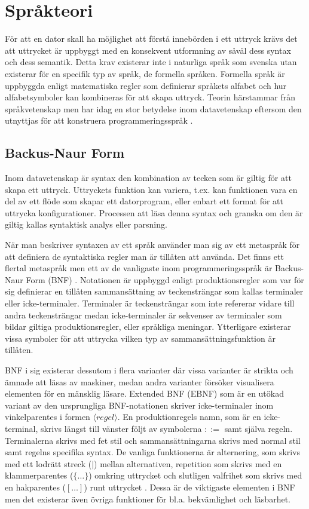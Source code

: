 \section{Språkteori}

För att en dator skall ha möjlighet att förstå innebörden i ett uttryck krävs
det att uttrycket är uppbyggt med en konsekvent utformning av såväl dess
syntax och dess semantik. Detta krav existerar inte i naturliga språk som
svenska utan existerar för en specifik typ av språk, de formella språken.
Formella språk är uppbyggda enligt matematiska regler som definierar språkets
alfabet och hur alfabetsymboler kan kombineras för att skapa uttryck. Teorin
härstammar från språkvetenskap men har idag en stor betydelse inom
datavetenskap eftersom den utnyttjas för att konstruera programmeringsspråk
\citep[s. 41]{sm09}.

\subsection{Backus-Naur Form}

Inom datavetenskap är syntax den kombination av tecken som är giltig för att
skapa ett uttryck. Uttryckets funktion kan variera, t.ex. kan funktionen
vara en del av ett flöde som skapar ett datorprogram, eller enbart ett format
för att uttrycka konfigurationer. Processen att läsa denna syntax och granska
om den är giltig kallas syntaktisk analys eller parsning.

När man beskriver syntaxen av ett språk använder man sig av ett metaspråk för
att definiera de syntaktiska regler man är tillåten att använda. Det finns ett
flertal metaspråk men ett av de vanligaste inom programmeringsspråk är
Backus-Naur Form (BNF) \citep[s. 27]{gd08}. Notationen är uppbyggd enligt
produktionsregler som var för sig definierar en tillåten sammansättning av
teckensträngar som kallas terminaler eller icke-terminaler. Terminaler är
teckensträngar som inte refererar vidare till andra teckensträngar medan
icke-terminaler är sekvenser av terminaler som bildar giltiga
produktionsregler, eller språkliga meningar. Ytterligare existerar vissa
symboler för att uttrycka vilken typ av sammansättningsfunktion är tillåten.

BNF i sig existerar dessutom i flera varianter där vissa varianter är strikta och
ämnade att läsas av maskiner, medan andra varianter försöker visualisera elementen
för en mänsklig läsare. Extended BNF (EBNF) som är en utökad variant av den
ursprungliga BNF-notationen skriver icke-terminaler inom vinkelparentes i
formen ${\langle}regel{\rangle}$. En produktionregels namn, som är en
icke-terminal,
skrivs längst till vänster följt av symbolerna $::=$ samt själva regeln.
Terminalerna skrivs med fet stil och sammansättningarna skrivs med normal
stil samt regelns specifika syntax. De vanliga funktionerna är alternering, som
skrivs med ett lodrätt streck ($|$) mellan alternativen, repetition som skrivs
med en klammerparentes ($\{ \ldots \}$) omkring uttrycket och slutligen
valfrihet som skrivs med en hakparentes ($[ \ldots ]$) runt uttrycket
\citep[s. 28]{gd08}. Dessa är de viktigaste elementen i BNF men det existerar
även övriga funktioner för bl.a. bekvämlighet och läsbarhet.

